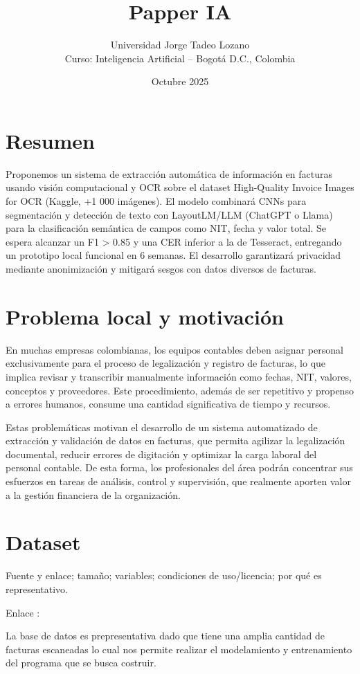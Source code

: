 \documentclass[11pt,letterpaper]{article}
\title{Papper IA}
\author{Universidad Jorge Tadeo Lozano \\ Curso: Inteligencia Artificial -- Bogotá D.C., Colombia}
\date{Octubre 2025}
\begin{document}
\maketitle
\section{Resumen}
Proponemos un sistema de extracción automática de información en facturas usando visión computacional y OCR sobre el dataset High-Quality Invoice Images for OCR (Kaggle, +1 000 imágenes). El modelo combinará CNNs para segmentación y detección de texto con LayoutLM/LLM (ChatGPT o Llama) para la clasificación semántica de campos como NIT, fecha y valor total. Se espera alcanzar un F1 > 0.85 y una CER inferior a la de Tesseract, entregando un prototipo local funcional en 6 semanas. El desarrollo garantizará privacidad mediante anonimización y mitigará sesgos con datos diversos de facturas.

\section{Problema local y motivación}
En muchas empresas colombianas, los equipos contables deben asignar personal exclusivamente para el proceso de legalización y registro de facturas, lo que implica revisar y transcribir manualmente información como fechas, NIT, valores, conceptos y proveedores. Este procedimiento, además de ser repetitivo y propenso a errores humanos, consume una cantidad significativa de tiempo y recursos.

Estas problemáticas motivan el desarrollo de un sistema automatizado de extracción y validación de datos en facturas, que permita agilizar la legalización documental, reducir errores de digitación y optimizar la carga laboral del personal contable. De esta forma, los profesionales del área podrán concentrar sus esfuerzos en tareas de análisis, control y supervisión, que realmente aporten valor a la gestión financiera de la organización.

\section{Dataset}
Fuente y enlace; tamaño; variables; condiciones de uso/licencia; por qué es representativo.

Enlace :

La base de datos es prepresentativa dado que tiene una amplia cantidad de facturas escaneadas lo cual nos permite realizar el modelamiento y entrenamiento del programa que se busca costruir.
\end{document}
